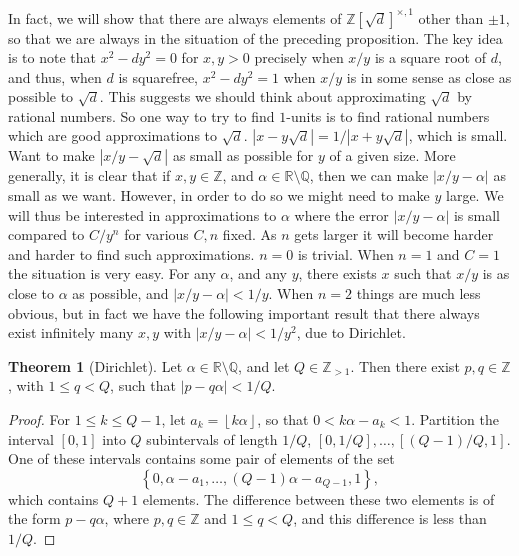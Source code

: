 \documentclass{article}
\newcommand{\Z}{\mathbb{Z}}
\newcommand{\Q}{\mathbb{Q}}
\newcommand{\R}{\mathbb{R}}
\newcommand{\rb}[1]{\left( #1 \right)}
\renewcommand{\sb}[1]{\left[ #1 \right]}
\newcommand{\cb}[1]{\left\{ #1 \right\}}
\newcommand{\abs}[1]{\left\lvert #1 \right\rvert}
\newcommand{\fb}[1]{\left\lfloor #1 \right\rfloor}
\theoremstyle{definition}\newtheorem{definition}{Definition}
\theoremstyle{definition}\newtheorem{remark}[definition]{Remark}
\theoremstyle{definition}\newtheorem*{example}{Example}
\theoremstyle{definition}\newtheorem*{note}{Note}
\newtheorem{theorem}[definition]{Theorem}
\begin{document}
In fact, we will show that there are always elements of $ \Z\sb{\sqrt{d}}^{\times, 1} $ other than $ \pm 1 $, so that we are always in the situation of the preceding proposition. The key idea is to note that $ x^2 - dy^2 = 0 $ for $ x, y > 0 $ precisely when $ x / y $ is a square root of $ d $, and thus, when $ d $ is squarefree, $ x^2 - dy^2 = 1 $ when $ x / y $ is in some sense as close as possible to $ \sqrt{d} $. This suggests we should think about approximating $ \sqrt{d} $ by rational numbers. So one way to try to find $ 1 $-units is to find rational numbers which are good approximations to $ \sqrt{d} $. $ \abs{x - y\sqrt{d}} = 1 / \abs{x + y\sqrt{d}} $, which is small. Want to make $ \abs{x / y - \sqrt{d}} $ as small as possible for $ y $ of a given size. More generally, it is clear that if $ x, y \in \Z $, and $ \alpha \in \R \setminus \Q $, then we can make $ \abs{x / y - \alpha} $ as small as we want. However, in order to do so we might need to make $ y $ large. We will thus be interested in approximations to $ \alpha $ where the error $ \abs{x / y - \alpha} $ is small compared to $ C / y^n $ for various $ C, n $ fixed. As $ n $ gets larger it will become harder and harder to find such approximations. $ n = 0 $ is trivial. When $ n = 1 $ and $ C = 1 $ the situation is very easy. For any $ \alpha $, and any $ y $, there exists $ x $ such that $ x / y $ is as close to $ \alpha $ as possible, and $ \abs{x / y - \alpha} < 1 / y $. When $ n = 2 $ things are much less obvious, but in fact we have the following important result that there always exist infinitely many $ x, y $ with $ \abs{x / y - \alpha} < 1 / y^2 $, due to Dirichlet.

\begin{theorem}[Dirichlet]
\label{thm:65}
Let $ \alpha \in \R \setminus \Q $, and let $ Q \in \Z_{> 1} $. Then there exist $ p, q \in \Z $, with $ 1 \le q < Q $, such that $ \abs{p - q\alpha} < 1 / Q $.
\end{theorem}

\begin{proof}
For $ 1 \le k \le Q - 1 $, let $ a_k = \fb{k\alpha} $, so that $ 0 < k\alpha - a_k < 1 $. Partition the interval $ \sb{0, 1} $ into $ Q $ subintervals of length $ 1 / Q $, $ \sb{0, 1 / Q}, \dots, \sb{\rb{Q - 1} / Q, 1} $. One of these intervals contains some pair of elements of the set
$$ \cb{0, \alpha - a_1, \dots, \rb{Q - 1}\alpha - a_{Q - 1}, 1}, $$
which contains $ Q + 1 $ elements. The difference between these two elements is of the form $ p - q\alpha $, where $ p, q \in \Z $ and $ 1 \le q < Q $, and this difference is less than $ 1 / Q $.
\end{proof}
\end{document}
